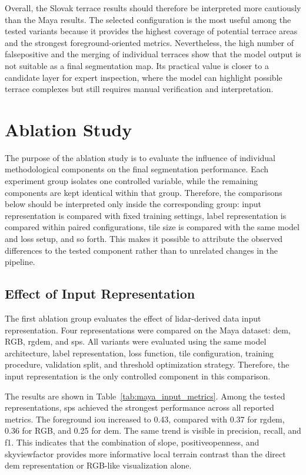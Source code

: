 Overall, the Slovak terrace results should therefore be interpreted more cautiously than the Maya results. The selected configuration is the most useful among the tested variants because it provides the highest coverage of potential terrace areas and the strongest foreground-oriented metrics. Nevertheless, the high number of \gls{falsepositive} and the merging of individual terraces show that the model output is not suitable as a final segmentation map. Its practical value is closer to a candidate layer for expert inspection, where the model can highlight possible terrace complexes but still requires manual verification and interpretation.

\section{Ablation Study}

The purpose of the ablation study is to evaluate the influence of individual methodological components on the final segmentation performance. Each experiment group isolates one controlled variable, while the remaining components are kept identical within that group. Therefore, the comparisons below should be interpreted only inside the corresponding group: input representation is compared with fixed training settings, label representation is compared within paired configurations, tile size is compared with the same model and loss setup, and so forth. This makes it possible to attribute the observed differences to the tested component rather than to unrelated changes in the pipeline.

\subsection{Effect of Input Representation}

The first ablation group evaluates the effect of \gls{lidar}-derived data input representation. Four representations were compared on the Maya dataset: \gls{dem}, RGB, \gls{rgdem}, and \gls{sps}. All variants were evaluated using the same model architecture, label representation, loss function, tile configuration, training procedure, validation split, and threshold optimization strategy. Therefore, the input representation is the only controlled component in this comparison.

The results are shown in Table~\ref{tab:maya_input_metrics}. Among the tested representations, \gls{sps} achieved the strongest performance across all reported metrics. The foreground \gls{iou} increased to 0.43, compared with 0.37 for \gls{rgdem}, 0.36 for RGB, and 0.25 for \gls{dem}. The same trend is visible in precision, recall, and \gls{f1}. This indicates that the combination of \gls{slope}, \gls{positiveopenness}, and \gls{skyviewfactor} provides more informative local terrain contrast than the direct \gls{dem} representation or RGB-like visualization alone.

